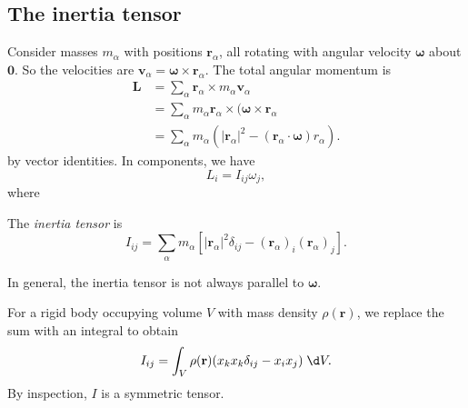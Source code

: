 \documentclass[a4paper]{article}
\begin{document}
\subsection{The inertia tensor}
Consider masses $m_\alpha$ with positions $\mathbf{r}_\alpha$, all rotating with angular velocity $\boldsymbol\omega$ about $\mathbf{0}$. So the velocities are $\mathbf{v}_\alpha = \boldsymbol\omega\times \mathbf{r}_\alpha$. The total angular momentum is 
\begin{align*}
  \mathbf{L} &= \sum_{\alpha} \mathbf{r}_\alpha \times m_\alpha \mathbf{v}_\alpha \\
  &= \sum_\alpha m_\alpha \mathbf{r}_\alpha \times (\boldsymbol\omega\times \mathbf{r}_\alpha\\
  &= \sum_\alpha m_\alpha( |\mathbf{r}_\alpha|^2 - (\mathbf{r}_\alpha \cdot \boldsymbol\omega)r_\alpha).
\end{align*}
by vector identities. In components, we have 
\[
  L_i = I_{ij}\omega_j,
\]
where
\begin{defi}
  The \emph{inertia tensor} is
  \[
    I_{ij} = \sum_\alpha m_\alpha [|\mathbf{r}_\alpha|^2 \delta_{ij} - (\mathbf{r}_\alpha)_i (\mathbf{r}_\alpha)_j].
  \]
\end{defi}
\note In general, the inertia tensor is not always parallel to $\boldsymbol\omega$.

For a rigid body occupying volume $V$ with mass density $\rho(\mathbf{r})$, we replace the sum with an integral to obtain
\[
  I_{ij} = \int_V \rho (\mathbf{r})(x_kx_k \delta_{ij} - x_i x_j)\;\d V.
\]
By inspection, $I$ is a symmetric tensor.
\end{document}
